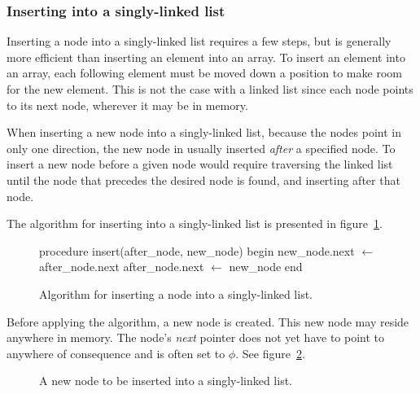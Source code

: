\documentclass{article}
\begin{document}
  \subsubsection{Inserting into a singly-linked list}
  Inserting a node into a singly-linked list requires a few steps, but is generally more efficient than inserting an element into an array. To insert an element into an array, each following element must be moved down a position to make room for the new element. This is not the case with a linked list since each node points to its next node, wherever it may be in memory.

  When inserting a new node into a singly-linked list, because the nodes point in only one direction, the new node in usually inserted \emph{after} a specified node. To insert a new node before a given node would require traversing the linked list until the node that precedes the desired node is found, and inserting after that node.

  The algorithm for inserting into a singly-linked list is presented in figure~\ref{fig:alg:singlelinkedlist-insert}.
  \begin{figure}[h]
    \begin{algorithm}
      procedure insert(after_node, new_node)
      begin
        new_node.next $\gets$ after_node.next
        after_node.next $\gets$ new_node
      end\end{algorithm}
    \caption{Algorithm for inserting a node into a singly-linked list.}
    \label{fig:alg:singlelinkedlist-insert}
  \end{figure}

  Before applying the algorithm, a new node is created. This new node may reside anywhere in memory. The node's \emph{next} pointer does not yet have to point to anywhere of consequence and is often set to $\phi$. See figure~\ref{fig:singlelinkedlist-newnode}.
  \begin{figure}[h]
    \centering
    \caption{A new node to be inserted into a singly-linked list.}
    \label{fig:singlelinkedlist-newnode}
  \end{figure}
\end{document}
